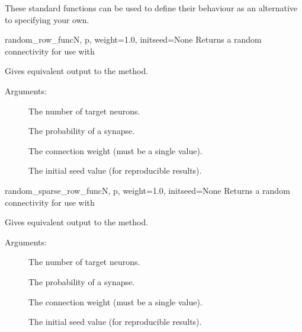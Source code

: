 \documentclass[letterpaper,10pt]{manual}
\begin{document}
These standard functions can be used to define their behaviour
as an alternative to specifying your own.


\hypertarget{brian.random_row_func}{}\begin{funcdesc}{random\_row\_func}{N, p, weight=1.0, initseed=None}
Returns a random connectivity  for use with \hyperlink{brian.UserComputedConnectionMatrix}{}

Gives equivalent output to the  method.

Arguments:
\begin{description}
\item[]
The number of target neurons.

\item[]
The probability of a synapse.

\item[]
The connection weight (must be a single value).

\item[]
The initial seed value (for reproducible results).

\end{description}
\end{funcdesc}


\hypertarget{brian.random_sparse_row_func}{}\begin{funcdesc}{random\_sparse\_row\_func}{N, p, weight=1.0, initseed=None}
Returns a random connectivity  for use with \hyperlink{brian.UserComputedSparseConnectionMatrix}{}

Gives equivalent output to the  method.

Arguments:
\begin{description}
\item[]
The number of target neurons.

\item[]
The probability of a synapse.

\item[]
The connection weight (must be a single value).

\item[]
The initial seed value (for reproducible results).

\end{description}
\end{funcdesc}
\end{document}
